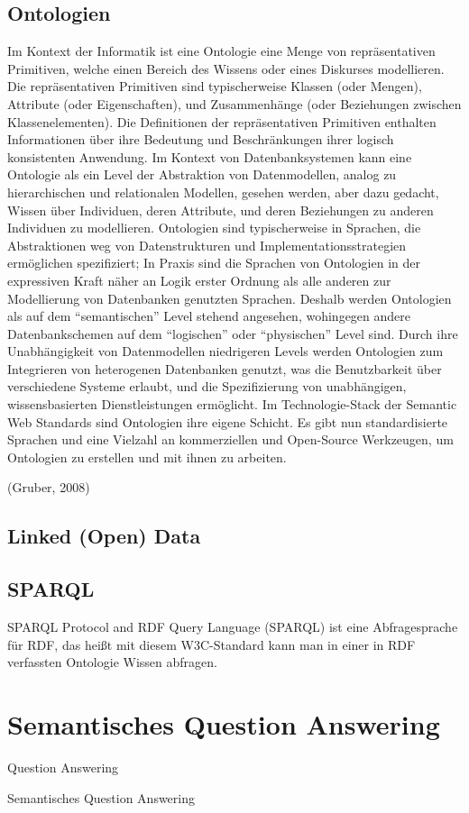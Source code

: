 \subsection{Ontologien}
\begin{definition}[Ontologie]
Im Kontext der Informatik ist eine Ontologie eine Menge von repräsentativen Primitiven, welche einen Bereich des Wissens oder eines Diskurses modellieren.
Die repräsentativen Primitiven sind typischerweise Klassen (oder Mengen), Attribute (oder Eigenschaften), und Zusammenhänge (oder Beziehungen zwischen Klassenelementen).
Die Definitionen der repräsentativen Primitiven enthalten Informationen über ihre Bedeutung und Beschränkungen ihrer logisch konsistenten Anwendung.
Im Kontext von Datenbanksystemen kann eine Ontologie als ein Level der Abstraktion von Datenmodellen, analog zu hierarchischen und relationalen Modellen, gesehen werden, aber dazu gedacht, Wissen über Individuen, deren Attribute, und deren Beziehungen zu anderen Individuen zu modellieren.
Ontologien sind typischerweise in Sprachen, die Abstraktionen weg von Datenstrukturen und Implementationsstrategien ermöglichen spezifiziert;
In Praxis sind die Sprachen von Ontologien in der expressiven Kraft näher an Logik erster Ordnung als alle anderen zur Modellierung von Datenbanken genutzten Sprachen.
Deshalb werden Ontologien als auf dem \enquote{semantischen} Level stehend angesehen, wohingegen andere Datenbankschemen auf dem \enquote{logischen} oder \enquote{physischen} Level sind.
Durch ihre Unabhängigkeit von Datenmodellen niedrigeren Levels werden Ontologien zum Integrieren von heterogenen Datenbanken genutzt, was die Benutzbarkeit über verschiedene Systeme erlaubt, und die Spezifizierung von unabhängigen, wissensbasierten  Dienstleistungen ermöglicht.
Im Technologie-Stack der Semantic Web Standards sind Ontologien ihre eigene Schicht.
Es gibt nun standardisierte Sprachen und eine Vielzahl an kommerziellen und Open-Source Werkzeugen, um Ontologien zu erstellen und mit ihnen zu arbeiten.
\end{definition} (Gruber, 2008)

\subsection{Linked (Open) Data}


\subsection{SPARQL}
SPARQL Protocol and RDF Query Language (SPARQL) ist eine Abfragesprache für RDF, das heißt mit diesem W3C-Standard kann man in einer in RDF verfassten Ontologie Wissen abfragen.

\section{Semantisches Question Answering}

\begin{definition}{Question Answering}

\end{definition}

\begin{definition}{Semantisches Question Answering}

\end{definition}
